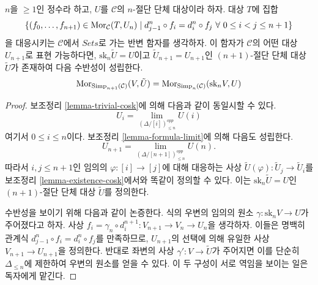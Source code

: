 \begin{lemma}
\label{lemma-work-out}
$n$을 $\geq 1$인 정수라 하고, $U$를 $\mathcal{C}$의
$n$-절단 단체 대상이라 하자. 대상 $T$에 집합
$$
\{ (f_0, \ldots, f_{n + 1}) \in \mathop{\mathrm{Mor}}\nolimits_\mathcal{C}(T, U_n)
\mid
d^n_{j - 1} \circ f_i = d^n_i \circ f_j
\ \forall\ 0\leq i < j\leq n + 1\}
$$
을 대응시키는 $\mathcal{C}$에서 $\textit{Sets}$로 가는 반변 함자를
생각하자. 이 함자가 $\mathcal{C}$의 어떤 대상 $U_{n + 1}$로
표현 가능하다면, $\text{sk}_n \tilde U = U$이고
$\tilde U_{n + 1} = U_{n + 1}$인 $(n + 1)$-절단 단체 대상
$\tilde U$가 존재하여 다음 수반성이 성립한다.
$$
\mathop{\mathrm{Mor}}\nolimits_{\text{Simp}_{n + 1}(\mathcal{C})}(V, \tilde U)
=
\mathop{\mathrm{Mor}}\nolimits_{\text{Simp}_n(\mathcal{C})}(\text{sk}_nV, U)
$$
\end{lemma}

\begin{proof}
보조정리 \ref{lemma-trivial-cosk}에 의해 다음과 같이 동일시할 수 있다.
$$
U_i = \lim_{(\Delta/[i])_{\leq n}^{opp}} U(i)
$$
여기서 $0 \leq i \leq n$이다. 보조정리 \ref{lemma-formula-limit}에 의해
다음도 성립한다.
$$
U_{n + 1} = \lim_{(\Delta/[n + 1])_{\leq n}^{opp}} U(n).
$$
따라서 $i, j \leq n + 1$인 임의의
$\varphi : [i] \to [j]$에 대해 대응하는 사상
$\tilde U(\varphi) : \tilde U_j \to \tilde U_i$를
보조정리 \ref{lemma-existence-cosk}에서와 똑같이 정의할 수 있다.
이는 $\text{sk}_n \tilde U = U$인 $(n + 1)$-절단 단체 대상
$\tilde U$를 정의한다.

\medskip\noindent
수반성을 보이기 위해 다음과 같이 논증한다. 식의 우변의 임의의 원소
$\gamma : \text{sk}_n V \to U$가 주어졌다고 하자. 사상
$f_i = \gamma_n \circ d^{n + 1}_i : V_{n + 1} \to V_n \to U_n$을
생각하자. 이들은 명백히 관계식
$d^n_{j - 1} \circ f_i = d^n_i \circ f_j$를 만족하므로,
$U_{n + 1}$의 선택에 의해 유일한 사상
$V_{n + 1} \to U_{n + 1}$을 정의한다.
반대로 좌변의 사상 $\gamma' : V \to \tilde U$가 주어지면 이를 단순히
$\Delta_{\leq n}$에 제한하여 우변의 원소를 얻을 수 있다.
이 두 구성이 서로 역임을 보이는 일은 독자에게 맡긴다.
\end{proof}

